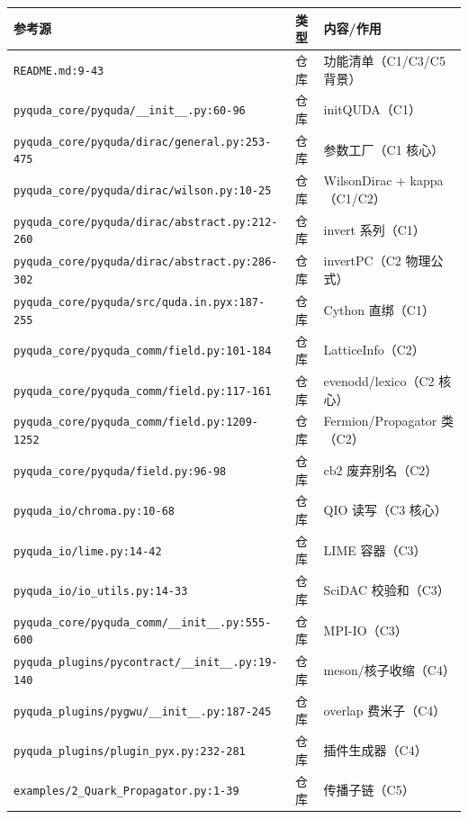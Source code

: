 \documentclass[UTF8]{ctexart}
\begin{document}
\begin{xltabular}{\textwidth}{llX}
\toprule
\textcolor{evidence}{参考源} & 类型 & 内容/作用 \\
\midrule
\endhead
\texttt{\nolinkurl{README.md:9-43}} & 仓库 & 功能清单（C1/C3/C5 背景） \\
\texttt{\nolinkurl{pyquda_core/pyquda/__init__.py:60-96}} & 仓库 & initQUDA（C1） \\
\texttt{\nolinkurl{pyquda_core/pyquda/dirac/general.py:253-475}} & 仓库 & 参数工厂（C1 核心） \\
\texttt{\nolinkurl{pyquda_core/pyquda/dirac/wilson.py:10-25}} & 仓库 & WilsonDirac + kappa（C1/C2） \\
\texttt{\nolinkurl{pyquda_core/pyquda/dirac/abstract.py:212-260}} & 仓库 & invert 系列（C1） \\
\texttt{\nolinkurl{pyquda_core/pyquda/dirac/abstract.py:286-302}} & 仓库 & invertPC（C2 物理公式） \\
\texttt{\nolinkurl{pyquda_core/pyquda/src/quda.in.pyx:187-255}} & 仓库 & Cython 直绑（C1） \\
\texttt{\nolinkurl{pyquda_core/pyquda_comm/field.py:101-184}} & 仓库 & LatticeInfo（C2） \\
\texttt{\nolinkurl{pyquda_core/pyquda_comm/field.py:117-161}} & 仓库 & evenodd/lexico（C2 核心） \\
\texttt{\nolinkurl{pyquda_core/pyquda_comm/field.py:1209-1252}} & 仓库 & Fermion/Propagator 类（C2） \\
\texttt{\nolinkurl{pyquda_core/pyquda/field.py:96-98}} & 仓库 & cb2 废弃别名（C2） \\
\texttt{\nolinkurl{pyquda_io/chroma.py:10-68}} & 仓库 & QIO 读写（C3 核心） \\
\texttt{\nolinkurl{pyquda_io/lime.py:14-42}} & 仓库 & LIME 容器（C3） \\
\texttt{\nolinkurl{pyquda_io/io_utils.py:14-33}} & 仓库 & SciDAC 校验和（C3） \\
\texttt{\nolinkurl{pyquda_core/pyquda_comm/__init__.py:555-600}} & 仓库 & MPI-IO（C3） \\
\texttt{\nolinkurl{pyquda_plugins/pycontract/__init__.py:19-140}} & 仓库 & meson/核子收缩（C4） \\
\texttt{\nolinkurl{pyquda_plugins/pygwu/__init__.py:187-245}} & 仓库 & overlap 费米子（C4） \\
\texttt{\nolinkurl{pyquda_plugins/plugin_pyx.py:232-281}} & 仓库 & 插件生成器（C4） \\
\texttt{\nolinkurl{examples/2_Quark_Propagator.py:1-39}} & 仓库 & 传播子链（C5） \\

\end{xltabular}
\end{document}
